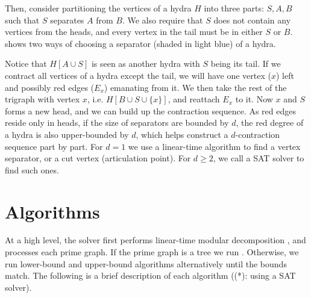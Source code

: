 \documentclass[a4paper,UKenglish,cleveref, autoref, thm-restate]{lipics-v2021}
\begin{document}
Then, consider partitioning the vertices of a hydra $H$ into three parts:
$S, A, B$ such that $S$ separates $A$ from $B$.
%
We also require that $S$ does not contain any vertices from the heads,
and every vertex in the tail must be in either $S$ or $B$.
%
 shows two ways of choosing a separator (shaded in light blue)
of a hydra.

Notice that $H[A \cup S]$ is seen as another hydra with $S$ being its tail.
If we contract all vertices of a hydra except the tail,
we will have one vertex ($x$) left and possibly red edges ($E_x$) emanating from it.
%
We then take the rest of the trigraph with vertex $x$, i.e. $H[B \cup S \cup \{x\}]$,
and reattach $E_x$ to it.
Now $x$ and $S$ forms a new head, and we can build up the contraction sequence.
%
As red edges reside only in heads,
if the size of separators are bounded by $d$,
the red degree of a hydra is also upper-bounded by $d$,
which helps construct a $d$-contraction sequence part by part.
%
For $d=1$ we use a linear-time algorithm to find a vertex separator,
or a cut vertex (articulation point).
For $d \geq 2$, we call a SAT solver to find such ones.

\section{Algorithms}

At a high level, the solver first performs linear-time modular decomposition \cite{tedder_simple_2008},
and processes each prime graph.
%
If the prime graph is a tree
we run \primetreesolver.
%
Otherwise, we run lower-bound and upper-bound algorithms alternatively
until the bounds match.
%
The following is a brief description of each algorithm ((*): using a SAT solver).
\end{document}
